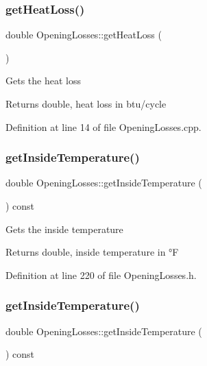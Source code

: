 \subsubsection{\texorpdfstring{get\+Heat\+Loss()}{getHeatLoss()}\hspace{0.1cm}{\footnotesize\ttfamily [3/3]}}
{\footnotesize\ttfamily double Opening\+Losses\+::get\+Heat\+Loss (\begin{DoxyParamCaption}{ }\end{DoxyParamCaption})}

Gets the heat loss \begin{DoxyReturn}{Returns}
double, heat loss in btu/cycle 
\end{DoxyReturn}


Definition at line 14 of file Opening\+Losses.\+cpp.

\mbox{\label{class_opening_losses_abe930dab77b1c855503ee51fdf66c88a}} 
\subsubsection{\texorpdfstring{get\+Inside\+Temperature()}{getInsideTemperature()}\hspace{0.1cm}{\footnotesize\ttfamily [1/3]}}
{\footnotesize\ttfamily double Opening\+Losses\+::get\+Inside\+Temperature (\begin{DoxyParamCaption}{ }\end{DoxyParamCaption}) const\hspace{0.3cm}{\ttfamily [inline]}}

Gets the inside temperature \begin{DoxyReturn}{Returns}
double, inside temperature in °F 
\end{DoxyReturn}


Definition at line 220 of file Opening\+Losses.\+h.

\mbox{\label{class_opening_losses_abe930dab77b1c855503ee51fdf66c88a}} 
\subsubsection{\texorpdfstring{get\+Inside\+Temperature()}{getInsideTemperature()}\hspace{0.1cm}{\footnotesize\ttfamily [2/3]}}
{\footnotesize\ttfamily double Opening\+Losses\+::get\+Inside\+Temperature (\begin{DoxyParamCaption}{ }\end{DoxyParamCaption}) const\hspace{0.3cm}{\ttfamily [inline]}}

